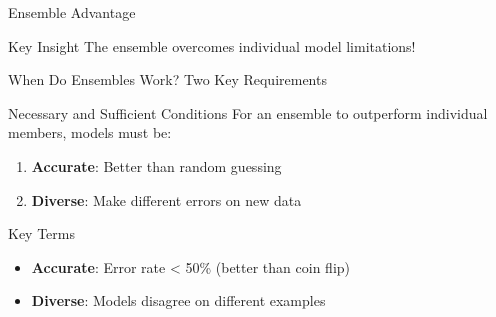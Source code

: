 \documentclass[10pt]{beamer}
\begin{document}
\begin{frame}{Ensemble Advantage}
\begin{keypointsbox}{Key Insight} 
  The ensemble overcomes individual model limitations!
\end{keypointsbox}
\end{frame}




\begin{frame}{When Do Ensembles Work? Two Key Requirements}
\begin{definitionbox}{Necessary and Sufficient Conditions}
For an ensemble to outperform individual members, models must be:
\begin{enumerate}
\item \textbf{Accurate}: Better than random guessing
\item \textbf{Diverse}: Make different errors on new data
\end{enumerate}
\end{definitionbox}

\begin{keypointsbox}{Key Terms}
\begin{itemize}
\item \textbf{Accurate}: Error rate < 50\% (better than coin flip)
\item \textbf{Diverse}: Models disagree on different examples
\end{itemize}
\end{keypointsbox}
\end{frame}
\end{document}
